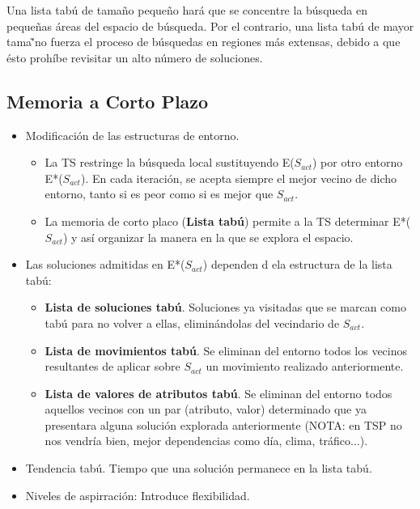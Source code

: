 \documentclass{llncs}
\begin{document}
Una lista tab\'{u} de tama\~{n}o peque\~{n}o har\'{a} que se concentre la b\'{u}squeda en peque\~{n}as \'{a}reas del espacio de b\'{u}squeda. Por el contrario, una lista tab\'{u} de mayor tama\~'{n}o fuerza el proceso de b\'{u}squedas en regiones m\'{a}s extensas, debido a que \'{e}sto proh\'{i}be revisitar un alto n\'{u}mero de soluciones.\\ 

\subsection*{Memoria a Corto Plazo}
\begin{itemize}
\item Modificaci\'{o}n de las estructuras de entorno.
\begin{itemize}
\item La TS restringe la b\'{u}squeda local sustituyendo E($S_{act}$) por otro entorno E*($S_{act}$). En cada iteraci\'{o}n, se acepta siempre el mejor vecino de dicho entorno, tanto si es peor como si es mejor que $S_{act}$.
\item La memoria de corto placo (\textbf{Lista tab\'{u}}) permite a la TS determinar E*($S_{act}$) y as\'{i} organizar la manera en la que se explora el espacio.
\end{itemize}
\item Las soluciones admitidas en E*($S_{act}$) dependen d ela estructura de la lista tab\'{u}:
\begin{itemize}
\item \textbf{Lista de soluciones tab\'{u}}. Soluciones ya visitadas que se marcan como tab\'{u} para no volver a ellas, elimin\'{a}ndolas del vecindario de $S_{act}$.
\item \textbf{Lista de movimientos tab\'{u}}. Se eliminan del entorno todos los vecinos resultantes de aplicar sobre $S_{act}$ un movimiento realizado anteriormente.
\item \textbf{Lista de valores de atributos tab\'{u}}. Se eliminan del entorno todos aquellos vecinos con un par (atributo, valor) determinado que ya presentara alguna soluci\'{o}n explorada anteriormente (NOTA: en TSP no nos vendr\'{i}a bien, mejor dependencias como d\'{i}a, clima, tr\'{a}fico...).
\end{itemize}
\item Tendencia tab\'{u}. Tiempo que una soluci\'{o}n permanece en la lista tab\'{u}.
\item Niveles de aspirraci\'{o}n: Introduce flexibilidad.
\begin{itemize}

\end{itemize}
\end{itemize}
\end{document}
